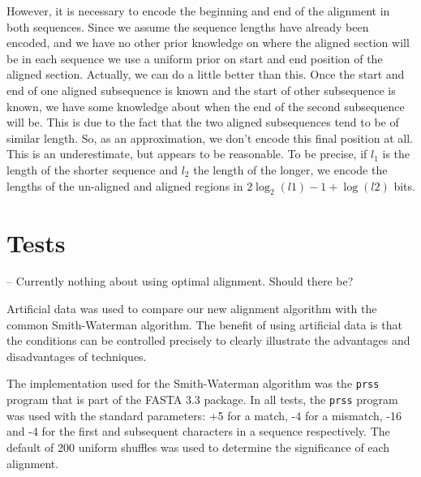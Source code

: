 \documentclass[letterpaper,11pt,oneside]{article}
\begin{document}
However, it is necessary to encode the beginning and end of the alignment in
both sequences.  Since we assume the sequence lengths have already been
encoded, and we have no other prior knowledge on where the aligned section
will be in each sequence we use a uniform prior on start and end position of
the aligned section.  Actually, we can do a little better than this.  Once the
start and end of one aligned subsequence is known and the start of other
subsequence is known, we have some knowledge about when the end of the second
subsequence will be.  This is due to the fact that the two aligned
subsequences tend to be of similar length.  So, as an approximation, we don't
encode this final position at all.  This is an underestimate, but appears to
be reasonable.  To be precise, if $l_1$ is the length of the shorter sequence
and $l_2$ the length of the longer, we encode the lengths of the un-aligned
and aligned regions in $2\log_2(l1) - 1 + \log(l2)$ bits.



\section{Tests}

-- Currently nothing about using optimal alignment.  Should there be?

Artificial data was used to compare our new alignment algorithm with the
common Smith-Waterman algorithm.  The benefit of using artificial data is that
the conditions can be controlled precisely to clearly illustrate the
advantages and disadvantages of techniques.

The implementation used for the Smith-Waterman algorithm was the \verb!prss!
program that is part of the FASTA 3.3 package.  In all tests, the \verb!prss!
program was used with the standard parameters: +5 for a match, -4 for a
mismatch, -16 and -4 for the first and subsequent characters in a sequence
respectively.  The default of 200 uniform shuffles was used to determine the
significance of each alignment.
\end{document}
